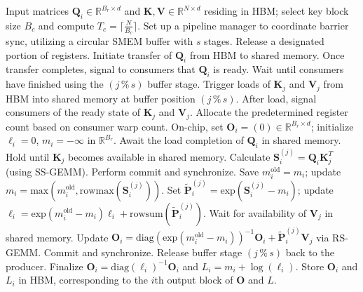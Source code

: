 \begin{algorithm}[H]
    \caption{\small\label{alg:flash3_wgmma_ws_only}\textsc{FlashAttention-3} forward pass \textbf{excluding} intra-consumer overlap -- CTA perspective}
    \begin{algorithmic}[1]
\REQUIRE Input matrices $\mathbf{Q}_i \in \mathbb{R}^{B_r \times d}$ and $\mathbf{K}, \mathbf{V} \in \mathbb{R}^{N \times d}$ residing in HBM; select key block size $B_c$ and compute $T_c = \lceil \frac{N}{B_c} \rceil$.
\STATE Set up a pipeline manager to coordinate barrier sync, utilizing a circular SMEM buffer with $s$ stages.
\STATE Release a designated portion of registers.
\STATE Initiate transfer of $\mathbf{Q}_i$ from HBM to shared memory.
\STATE Once transfer completes, signal to consumers that $\mathbf{Q}_i$ is ready.
    \STATE Wait until consumers have finished using the $(j\,\%\,s)$ buffer stage.
    \STATE Trigger loads of $\mathbf{K}_j$ and $\mathbf{V}_j$ from HBM into shared memory at buffer position $(j\,\%\,s)$.
    \STATE After load, signal consumers of the ready state of $\mathbf{K}_j$ and $\mathbf{V}_j$.
\ENDFOR
\ELSE 
\STATE Allocate the predetermined register count based on consumer warp count.
\STATE On-chip, set $\mathbf{O}_i = (0) \in \mathbb{R}^{B_r \times d}$; initialize $\ell_i = 0$, $m_i = -\infty$ in $\mathbb{R}^{B_r}$.
\STATE Await the load completion of $\mathbf{Q}_i$ in shared memory.
\STATE Hold until $\mathbf{K}_j$ becomes available in shared memory.
\STATE Calculate $\mathbf{S}_i^{(j)} = \mathbf{Q}_i \mathbf{K}_j^T$ (using SS-GEMM). Perform commit and synchronize. \label{alg:ws_only_gemm1}
\STATE Save $m_i^{\mathrm{old}} = m_i$; update $m_i = \mathrm{max}(m_i^{\mathrm{old}}, \mathrm{rowmax}(\mathbf{S}_i^{(j)}))$. \label{code-ws:softmax_start}
\STATE Set $\widetilde{\mathbf{P}}_i^{(j)} = \mathrm{exp}(\mathbf{S}_i^{(j)} - m_i)$; update $\ell_i = \mathrm{exp}(m_i^{\mathrm{old}} - m_i) \ell_i + \mathrm{rowsum}(\widetilde{\mathbf{P}}_i^{(j)})$. \label{code-ws:softmax_end}
\STATE Wait for availability of $\mathbf{V}_j$ in shared memory.
\STATE Update $\mathbf{O}_i = \mathrm{diag}(\mathrm{exp}(m_i^{\mathrm{old}} - m_i))^{-1} \mathbf{O}_i + \widetilde{\mathbf{P}}_i^{(j)} \mathbf{V}_j$ via RS-GEMM. Commit and synchronize. \label{alg:ws_only_gemm2}
\STATE Release buffer stage $(j\,\%\,s)$ back to the producer.
\ENDFOR
\STATE Finalize $\mathbf{O}_i = \mathrm{diag}(\ell_i)^{-1} \mathbf{O}_i$ and $L_i = m_i + \log(\ell_i)$.
\STATE Store $\mathbf{O}_i$ and $L_i$ in HBM, corresponding to the $i$th output block of $\mathbf{O}$ and $L$.
\ENDIF
\end{algorithmic}
\end{algorithm}

